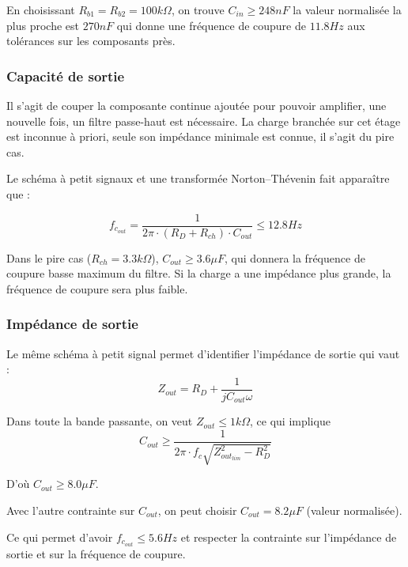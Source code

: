 \documentclass[11pt,a4paper]{article}
\theoremstyle{definition}%
\begin{document}
{En choisissant $R_{b1}=R_{b2}=100 k\Omega$, on trouve $C_{in}\geq 248nF$ la valeur normalisée la plus proche est $270nF$ qui donne une fréquence de coupure de $11.8Hz$ aux tolérances sur les composants près.

\begin{center}
\end{center}



\subsubsection{Capacité de sortie}
Il s'agit de couper la composante continue ajoutée pour pouvoir amplifier, une nouvelle fois, un filtre passe-haut est nécessaire.
La charge branchée sur cet étage est inconnue à priori, seule son impédance minimale est connue,  il s'agit du pire cas.

Le schéma à petit signaux et une transformée Norton--Thévenin fait apparaître que :

$$f_{c_{out}}=\frac{1}{2\pi\cdot\left(R_{D}+R_{ch}\right)\cdot C_{out}}\leq 12.8Hz$$ 

Dans le pire cas ($R_{ch}=3.3k\Omega$), $C_{out}\geq 3.6\mu F$, qui donnera la fréquence de coupure basse maximum du filtre. Si la charge a une impédance plus grande, la fréquence de coupure sera plus faible.

\begin{center}
\end{center}

\subsubsection{Impédance de sortie}
Le même schéma à petit signal permet d'identifier l'impédance de sortie qui vaut : $$Z_{out}=R_D+\frac{1}{jC_{out}\omega}$$

Dans toute la bande passante, on veut $Z_{out}\leq 1k\Omega$, ce qui implique $$C_{out}\geq \frac{1}{2\pi\cdot f_c \sqrt{Z_{out_{lim}}^2-R_D^2}}$$

D'où $C_{out}\geq 8.0\mu F$.

Avec l'autre contrainte sur $C_{out}$, on peut choisir $C_{out}=8.2\mu F$ (valeur normalisée).

Ce qui permet d'avoir $f_{c_{out}}\leq 5.6Hz$ et respecter la contrainte sur l'impédance de sortie et sur la fréquence de coupure.


}
\end{document}
